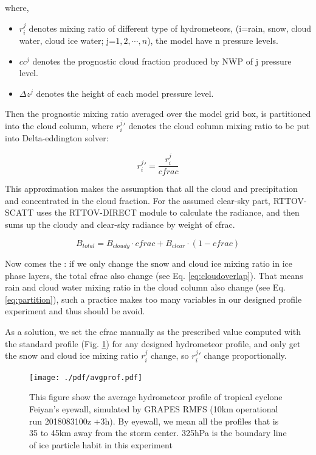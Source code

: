 where,

\begin{itemize}
    \item $r_{i}^{j}$ denotes mixing ratio of different type of hydrometeors, 
    (i=rain, snow, cloud water, cloud ice water; j=$1, 2, \cdots, n$), the model have n pressure levels.

    \item $cc^{j}$ denotes the prognostic cloud fraction produced by NWP of j pressure level.

    \item $\Delta z^{j}$ denotes the height of each model pressure level.
\end{itemize}

Then the prognostic mixing ratio averaged over the model grid box, is partitioned into the cloud column,
where $r_{i}^{j}\prime$ denotes the cloud column mixing ratio to be put into Delta-eddington solver:

\begin{equation} \label{eq:partition}
    r_{i}^{j}\prime = \frac{r_{i}^{j}}{cfrac} 
\end{equation}

This approximation makes the assumption that all the cloud and precipitation and concentrated in the cloud fraction.
For the assumed clear-sky part, RTTOV-SCATT uses the RTTOV-DIRECT module to calculate the radiance, and then sums up the cloudy
and clear-sky radiance by weight of cfrac.

\begin{equation} \label{eq:sumup}
    B_{total} = B_{cloudy} \cdot cfrac + B_{clear} \cdot (1 - cfrac)  
\end{equation}

Now comes the : if we only change the snow and cloud ice mixing ratio in ice phase layers, the total cfrac
also change (see Eq. \ref{eq:cloudoverlap}). That means rain and cloud water mixing ratio in the cloud column also change (see Eq. \ref{eq:partition}),
such a practice makes too many variables in our designed profile experiment and thus should be avoid.

As a solution, we set the cfrac manually as the prescribed value computed with the standard profile (Fig. \ref{fig:stdprofile}) for any designed hydrometeor profile, 
and only get the snow and cloud ice mixing ratio $r_{i}^{j}$ change, so $r_{i}^{j}\prime$ change proportionally.

\begin{figure}[hbtp] 
\centering
\texttt{[image: ./pdf/avgprof.pdf]} 
\caption{This figure show the average hydrometeor profile of 
tropical cyclone Feiyan's eyewall, simulated by GRAPES RMFS (10km operational run 2018083100z +3h).
By eyewall, we mean all the profiles that is 35 to 45km away from the storm center.
325hPa is the boundary line of ice particle habit in this experiment}
\label{fig:stdprofile}
\end{figure}

